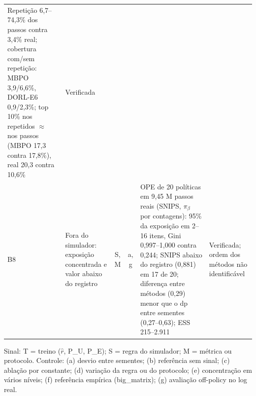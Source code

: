 \begin{landscape}
\begin{table}[p]
\begin{threeparttable}
\begin{tabularx}{\linewidth}{@{}l>{\raggedright\arraybackslash}p{4.6cm}cc>{\raggedright\arraybackslash}X>{\raggedright\arraybackslash}p{3.0cm}@{}}
  Repetição 6,7--74,3\% dos passos contra 3,4\% real; cobertura com/sem repetição: MBPO 3,9/6,6\%, DORL-E6 0,9/2,3\%;
  top 10\% nos repetidos $\approx$ nos passos (MBPO 17,3 contra 17,8\%), real 20,3 contra 10,6\% & Verificada \\
B8 & Fora do simulador: exposição concentrada e valor abaixo do registro & S, M & a, g &
  OPE de 20 políticas em 9,45 M passos reais (SNIPS, $\pi_\beta$ por contagens): 95\% da exposição em 2--16 itens, Gini 0,997--1,000 contra 0,244;
  SNIPS abaixo do registro (0,881) em 17 de 20; diferença entre métodos (0,29) menor que o dp entre sementes (0,27--0,63); ESS 215--2.911 &
  Verificada; ordem dos métodos não identificável \\
\bottomrule
\end{tabularx}
\begin{tablenotes}\footnotesize
\item Sinal: T = treino ($\hat r$, P\_U, P\_E); S = regra do simulador; M = métrica ou protocolo.
  Controle: (a) desvio entre sementes; (b) referência sem sinal; (c) ablação por constante;
  (d) variação da regra ou do protocolo; (e) concentração em vários níveis;
  (f) referência empírica (big\_matrix); (g) avaliação off-policy no log real.
\end{tablenotes}
\end{threeparttable}
\end{table}
\end{landscape}
